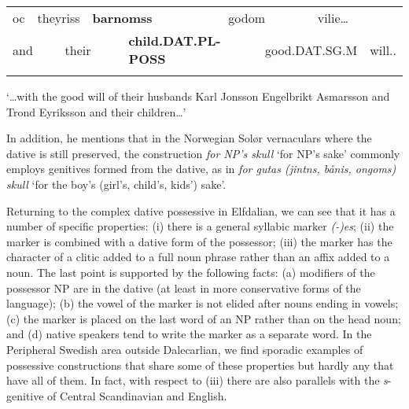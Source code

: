 \begin{tabular}{llllllllll}
\lsptoprule
oc & \multicolumn{2}{l}{theyriss

} & \multicolumn{2}{l}{{\bfseries barnomss}

} & \multicolumn{2}{l}{godom

} & \multicolumn{2}{l}{vilie…

} & \\
\multicolumn{2}{l}{and

} & \multicolumn{2}{l}{their

} & \multicolumn{2}{l}{{\bfseries child.DAT.PL-POSS}

} & \multicolumn{2}{l}{good.DAT.SG.M

} & \multicolumn{2}{l}{will..

}\\
\lspbottomrule
\end{tabular}

\begin{styleTranslation}
‘…with the good will of their husbands Karl Jonsson Engelbrikt Asmarsson and Trond Eyriksson and their children…’

\end{styleTranslation}

\begin{styleBodyTextFirst}
In addition, he mentions that in the Norwegian Solør vernaculars where the dative is still preserved, the construction \textit{for NP’s skull }‘for NP’s sake’ commonly employs genitives formed from the dative, as in \textit{for gutas (jintns, bånis, ongoms) skull} ‘for the boy’s (girl’s, child’s, kids’) sake’. 

\end{styleBodyTextFirst}

\begin{styleBodytextC}
Returning to the complex dative possessive in Elfdalian, we can see that it has a number of specific properties: (i) there is a general syllabic marker \textit{(-)es}; (ii) the marker is combined with a dative form of the possessor; (iii) the marker has the character of a clitic added to a full noun phrase rather than an affix added to a noun. The last point is supported by  the following facts: (a) modifiers of the possessor NP are in the dative (at least in more conservative forms of the language); (b) the vowel of the marker is not elided after nouns ending in vowels; (c) the marker is placed on the last word of an NP rather than on the head noun; and (d) native speakers tend to write the marker as a separate word. In the Peripheral Swedish area outside Dalecarlian, we find sporadic examples of possessive constructions that share some of these properties but hardly any that have all of them. In fact, with respect to (iii) there are also parallels with the \textit{s}{}-genitive of Central Scandinavian and English. 

\end{styleBodytextC}

